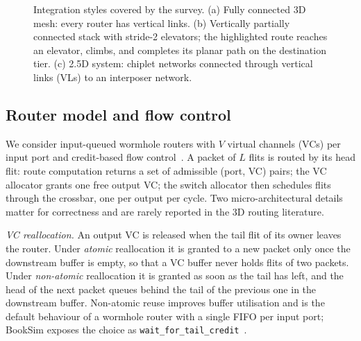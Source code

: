 \begin{figure}[tbp]
\caption{Integration styles covered by the survey. (a) Fully connected 3D mesh: every router has vertical links. (b) Vertically partially connected stack with stride-2 elevators; the highlighted route reaches an elevator, climbs, and completes its planar path on the destination tier. (c) 2.5D system: chiplet networks connected through vertical links (VLs) to an interposer network.}
\label{fig:arch}
\end{figure}

\subsection{Router model and flow control}
\label{sec:bg-router}

We consider input-queued wormhole routers with $V$ virtual channels (VCs) per input port and credit-based flow control~\cite{dally2004principles}. A packet of $L$ flits is routed by its head flit: route computation returns a set of admissible (port, VC) pairs; the VC allocator grants one free output VC; the switch allocator then schedules flits through the crossbar, one per output per cycle. Two micro-architectural details matter for correctness and are rarely reported in the 3D routing literature.

\emph{VC reallocation.} An output VC is released when the tail flit of its owner leaves the router. Under \emph{atomic} reallocation it is granted to a new packet only once the downstream buffer is empty, so that a VC buffer never holds flits of two packets. Under \emph{non-atomic} reallocation it is granted as soon as the tail has left, and the head of the next packet queues behind the tail of the previous one in the downstream buffer. Non-atomic reuse improves buffer utilisation and is the default behaviour of a wormhole router with a single FIFO per input port; BookSim exposes the choice as \texttt{wait\_for\_tail\_credit}~\cite{jiang2013booksim}.

